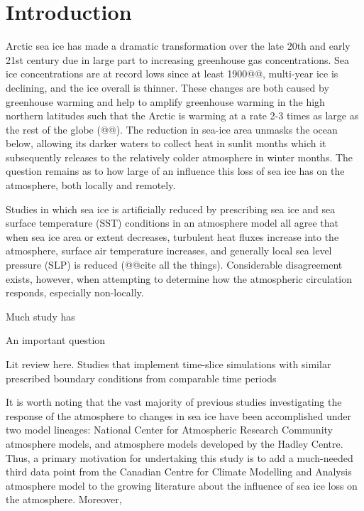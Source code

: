 \documentclass[twocol]{ametsoc}
\begin{document}

\section{Introduction}

Arctic sea ice has made a dramatic transformation over the late 20th and early 21st century due in large part to increasing greenhouse gas concentrations. Sea ice concentrations are at record lows since at least 1900@@, multi-year ice is declining, and the ice overall is thinner. These changes are both caused by greenhouse warming and help to amplify greenhouse warming in the high northern latitudes such that the Arctic is warming at a rate 2-3 times as large as the rest of the globe (@@). The reduction in sea-ice area unmasks the ocean below, allowing its darker waters to collect heat in sunlit months which it subsequently releases to the relatively colder atmosphere in winter months. The question remains as to how large of an influence this loss of sea ice has on the atmosphere, both locally and remotely. %

Studies in which sea ice is artificially reduced by prescribing sea ice and sea surface temperature (SST) conditions in an atmosphere model all agree that when sea ice area or extent decreases, turbulent heat fluxes increase into the atmosphere, surface air temperature increases, and generally local sea level pressure (SLP) is reduced (@@cite all the things). Considerable disagreement exists, however, when attempting to determine how the atmospheric circulation responds, especially non-locally. 

Much study has 

An important question

Lit review here.
Studies that implement time-slice simulations with similar prescribed boundary conditions from comparable time periods 

It is worth noting that the vast majority of previous studies investigating the response of the atmosphere to changes in sea ice have been accomplished under two model lineages: National Center for Atmospheric Research Community atmosphere models, and atmosphere models developed by the Hadley Centre. Thus, a primary motivation for undertaking this study is to add a much-needed third data point from the Canadian Centre for Climate Modelling and Analysis atmosphere model to the growing literature about the influence of sea ice loss on the atmosphere. Moreover, 
\end{document}

